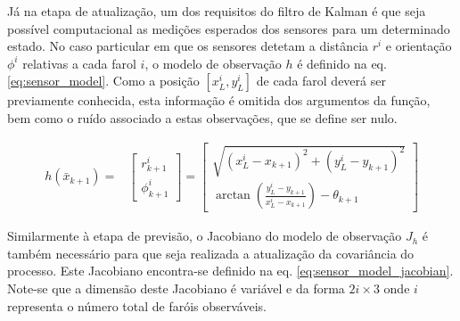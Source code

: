\documentclass{article}
\begin{document}
Já na etapa de atualização, um dos requisitos do filtro de Kalman é que seja possível computacional as medições esperados dos sensores para um determinado estado. No caso particular em que os sensores detetam a distância $r^i$ e orientação $\phi^i$ relativas a cada farol $i$, o modelo de observação $h$ é definido na eq. \ref{eq:sensor_model}. Como a posição $[x^i_L, y^i_L]$ de cada farol deverá ser previamente conhecida, esta informação é omitida dos argumentos da função, bem como o ruído associado a estas observações, que se define ser nulo.

\begin{equation}
    \begin{split}
        h(\bar{x}_{k+1}) =& \begin{bmatrix}
            r_{k+1}^i \\
            \phi_{k+1}^i
        \end{bmatrix}
        = \begin{bmatrix}
            \sqrt{(x_L^i - x_{k+1})^2 + (y_L^i - y_{k+1})^2} \\
            \arctan(\frac{y_L^i - y_{k+1}}{x_L^i - x_{k+1}}) - \theta_{k+1}
        \end{bmatrix}
    \end{split}
    \label{eq:sensor_model}
\end{equation}

Similarmente à etapa de previsão, o Jacobiano do modelo de observação $J_h$ é também necessário para que seja realizada a atualização da covariância do processo. Este Jacobiano encontra-se definido na eq. \ref{eq:sensor_model_jacobian}. Note-se que a dimensão deste Jacobiano é variável e da forma $2i \times 3$ onde $i$ representa o número total de faróis observáveis.
\end{document}
